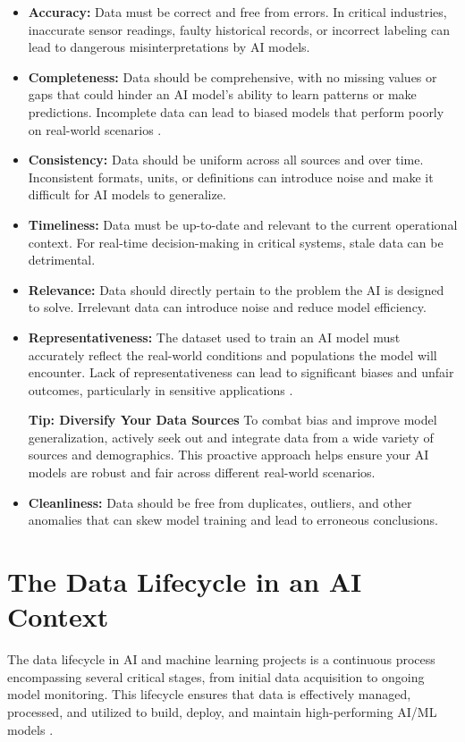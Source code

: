 \begin{itemize}
    \item \textbf{Accuracy:} Data must be correct and free from errors. In critical industries, inaccurate sensor readings, faulty historical records, or incorrect labeling can lead to dangerous misinterpretations by AI models.
    \item \textbf{Completeness:} Data should be comprehensive, with no missing values or gaps that could hinder an AI model's ability to learn patterns or make predictions. Incomplete data can lead to biased models that perform poorly on real-world scenarios \parencite{Wang2019}.
    \item \textbf{Consistency:} Data should be uniform across all sources and over time. Inconsistent formats, units, or definitions can introduce noise and make it difficult for AI models to generalize.
    \item \textbf{Timeliness:} Data must be up-to-date and relevant to the current operational context. For real-time decision-making in critical systems, stale data can be detrimental.
    \item \textbf{Relevance:} Data should directly pertain to the problem the AI is designed to solve. Irrelevant data can introduce noise and reduce model efficiency.
    \item \textbf{Representativeness:} The dataset used to train an AI model must accurately reflect the real-world conditions and populations the model will encounter. Lack of representativeness can lead to significant biases and unfair outcomes, particularly in sensitive applications \parencite{Buolamwini2018}.
\begin{tipbox}
    \textbf{Tip: Diversify Your Data Sources}
    To combat bias and improve model generalization, actively seek out and integrate data from a wide variety of sources and demographics. This proactive approach helps ensure your AI models are robust and fair across different real-world scenarios.
\end{tipbox}
    \item \textbf{Cleanliness:} Data should be free from duplicates, outliers, and other anomalies that can skew model training and lead to erroneous conclusions.
\end{itemize}

\section{The Data Lifecycle in an AI Context}
\label{sec:data_lifecycle}
The data lifecycle in AI and machine learning projects is a continuous process encompassing several critical stages, from initial data acquisition to ongoing model monitoring. This lifecycle ensures that data is effectively managed, processed, and utilized to build, deploy, and maintain high-performing AI/ML models \parencite{Milvus2023}.

